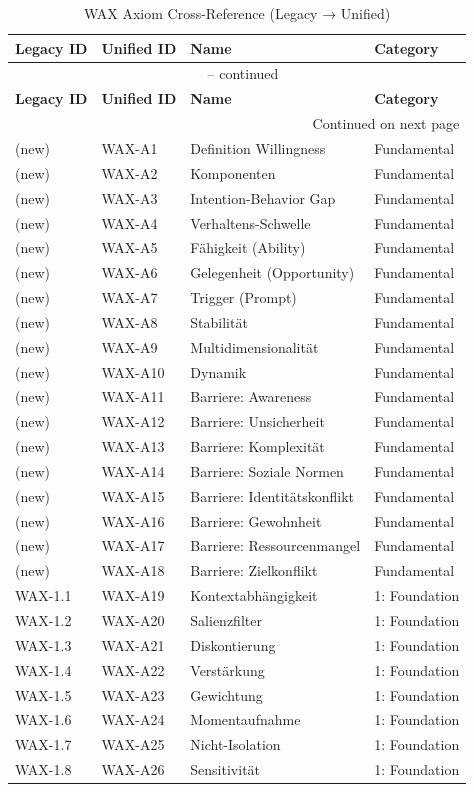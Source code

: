 \begin{longtable}{@{}llll@{}}
\caption{WAX Axiom Cross-Reference (Legacy → Unified)} \\
\toprule
\textbf{Legacy ID} & \textbf{Unified ID} & \textbf{Name} & \textbf{Category} \\
\midrule
\endfirsthead
\multicolumn{4}{c}{\tablename\ \thetable{} -- continued} \\
\toprule
\textbf{Legacy ID} & \textbf{Unified ID} & \textbf{Name} & \textbf{Category} \\
\midrule
\endhead
\midrule
\multicolumn{4}{r}{Continued on next page} \\
\endfoot
\bottomrule
\endlastfoot

(new) & WAX-A1 & Definition Willingness & Fundamental \\
(new) & WAX-A2 & Komponenten & Fundamental \\
(new) & WAX-A3 & Intention-Behavior Gap & Fundamental \\
(new) & WAX-A4 & Verhaltens-Schwelle & Fundamental \\
(new) & WAX-A5 & Fähigkeit (Ability) & Fundamental \\
(new) & WAX-A6 & Gelegenheit (Opportunity) & Fundamental \\
(new) & WAX-A7 & Trigger (Prompt) & Fundamental \\
(new) & WAX-A8 & Stabilität & Fundamental \\
(new) & WAX-A9 & Multidimensionalität & Fundamental \\
(new) & WAX-A10 & Dynamik & Fundamental \\
(new) & WAX-A11 & Barriere: Awareness & Fundamental \\
(new) & WAX-A12 & Barriere: Unsicherheit & Fundamental \\
(new) & WAX-A13 & Barriere: Komplexität & Fundamental \\
(new) & WAX-A14 & Barriere: Soziale Normen & Fundamental \\
(new) & WAX-A15 & Barriere: Identitätskonflikt & Fundamental \\
(new) & WAX-A16 & Barriere: Gewohnheit & Fundamental \\
(new) & WAX-A17 & Barriere: Ressourcenmangel & Fundamental \\
(new) & WAX-A18 & Barriere: Zielkonflikt & Fundamental \\
\midrule

WAX-1.1 & WAX-A19 & Kontextabhängigkeit & 1: Foundation \\
WAX-1.2 & WAX-A20 & Salienzfilter & 1: Foundation \\
WAX-1.3 & WAX-A21 & Diskontierung & 1: Foundation \\
WAX-1.4 & WAX-A22 & Verstärkung & 1: Foundation \\
WAX-1.5 & WAX-A23 & Gewichtung & 1: Foundation \\
WAX-1.6 & WAX-A24 & Momentaufnahme & 1: Foundation \\
WAX-1.7 & WAX-A25 & Nicht-Isolation & 1: Foundation \\
WAX-1.8 & WAX-A26 & Sensitivität & 1: Foundation \\
\midrule


\end{longtable}

